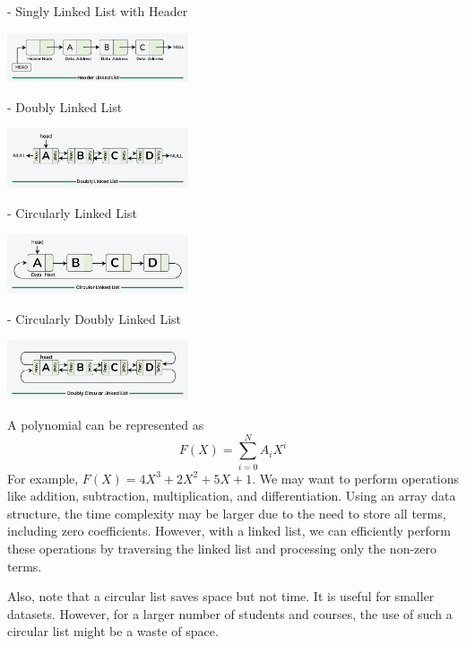 - Singly Linked List with Header  
{\par\centering
\includegraphics[width=0.4\textwidth]{Figure/header-linked-list.png}
\par}

- Doubly Linked List  
{\par\centering
\includegraphics[width=0.4\textwidth]{Figure/doubly-linked-list.png}
\par}

- Circularly Linked List  
{\par\centering
\includegraphics[width=0.4\textwidth]{Figure/circular-linked-list.png}
\par}

- Circularly Doubly Linked List  
{\par\centering
\includegraphics[width=0.4\textwidth]{Figure/double-cir-linked-list.png}
\par}

A polynomial can be represented as
\[
  F(X) = \sum_{i = 0}^N A_{i} X^i
\]
For example, \(F(X) = 4X^3 + 2X^2 + 5X + 1\). We may want to perform operations like addition, subtraction, multiplication, and differentiation. Using an array data structure, the time complexity may be larger due to the need to store all terms, including zero coefficients. However, with a linked list, we can efficiently perform these operations by traversing the linked list and processing only the non-zero terms.

Also, note that a circular list saves space but not time. It is useful for smaller datasets. However, for a larger number of students and courses, the use of such a circular list might be a waste of space.

